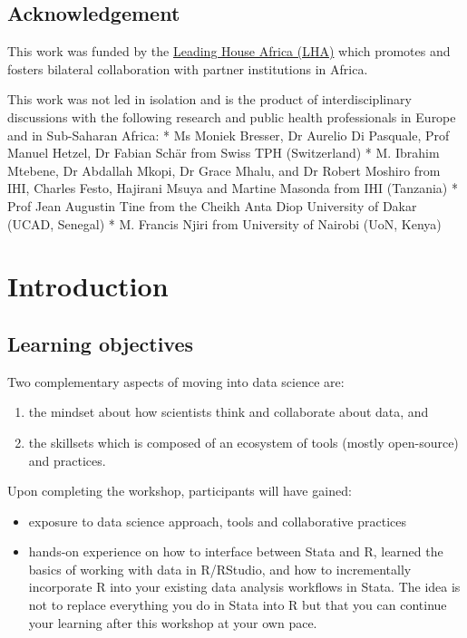 \documentclass[
  letterpaper,
  DIV=11,
  numbers=noendperiod,
  oneside]{scrreprt}
\providecommand{\tightlist}{%
  \setlength{\itemsep}{0pt}\setlength{\parskip}{0pt}}\usepackage{longtable,booktabs,array}
\begin{document}
\hypertarget{acknowledgement}{%
\section*{Acknowledgement}\label{acknowledgement}}


This work was funded by the
\href{https://www.swisstph.ch/en/research/leading-house-africa/}{Leading
House Africa (LHA)} which promotes and fosters bilateral collaboration
with partner institutions in Africa.

This work was not led in isolation and is the product of
interdisciplinary discussions with the following research and public
health professionals in Europe and in Sub-Saharan Africa: * Ms Moniek
Bresser, Dr Aurelio Di Pasquale, Prof Manuel Hetzel, Dr Fabian Schär
from Swiss TPH (Switzerland) * M. Ibrahim Mtebene, Dr Abdallah Mkopi, Dr
Grace Mhalu, and Dr Robert Moshiro from IHI, Charles Festo, Hajirani
Msuya and Martine Masonda from IHI (Tanzania) * Prof Jean Augustin Tine
from the Cheikh Anta Diop University of Dakar (UCAD, Senegal) * M.
Francis Njiri from University of Nairobi (UoN, Kenya)


\hypertarget{introduction-1}{%
\chapter{Introduction}\label{introduction-1}}

\hypertarget{learning-objectives}{%
\section{Learning objectives}\label{learning-objectives}}

Two complementary aspects of moving into data science are:

\begin{enumerate}
\def\labelenumi{\arabic{enumi}.}
\tightlist
\item
  the mindset about how scientists think and collaborate about data, and
\item
  the skillsets which is composed of an ecosystem of tools (mostly
  open-source) and practices.
\end{enumerate}

Upon completing the workshop, participants will have gained:

\begin{itemize}
\tightlist
\item
  exposure to data science approach, tools and collaborative practices
\item
  hands-on experience on how to interface between Stata and R, learned
  the basics of working with data in R/RStudio, and how to incrementally
  incorporate R into your existing data analysis workflows in Stata. The
  idea is not to replace everything you do in Stata into R but that you
  can continue your learning after this workshop at your own pace.
\end{itemize}
\end{document}
